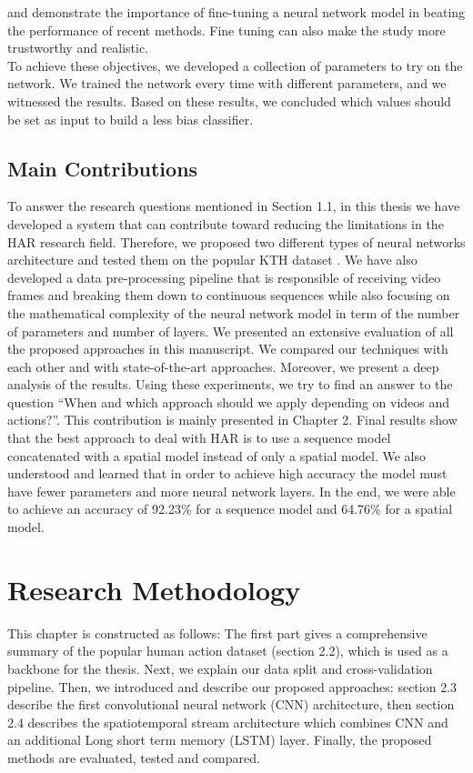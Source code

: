 \cite{diba2018spatio} and \cite{liu2018attentive} demonstrate the importance of fine-tuning a neural network model in beating the performance of recent methods. Fine tuning can also make the study more trustworthy and realistic.\\
    
    
To achieve these objectives, we developed a collection of parameters to try on the network. We trained the network every time with different parameters, and we witnessed the results. Based on these results, we concluded which values should be set as input to build a less bias classifier.

\section{Main Contributions}
To answer the research questions mentioned in Section 1.1, in this thesis we have developed a system that can contribute toward reducing the limitations in the HAR research field. Therefore, we proposed two different types of neural networks architecture and tested them on the popular KTH dataset \cite{schuldt2004recognizing}. We have also developed a data pre-processing pipeline that is responsible of receiving video frames and breaking them down to continuous sequences while also focusing on the mathematical complexity of the neural network model in term of the number of parameters and number of layers. We presented an extensive evaluation of all the proposed approaches in this manuscript. We compared our techniques with each other and with state-of-the-art approaches. Moreover, we present a deep analysis of the results. Using these experiments, we try to find an answer to the question “When and which approach should we apply depending on videos and actions?”. This contribution is mainly presented in Chapter 2. Final results show that the best approach to deal with HAR is to use a sequence model concatenated with a spatial model instead of only a spatial model. We also understood and learned that in order to achieve high accuracy the model must have fewer parameters and more neural network layers. In the end, we were able to achieve an accuracy of 92.23\% for a sequence model and 64.76\% for a spatial model.

\chapter{Research Methodology}\label{ThesisConventions}
This chapter is constructed as follows: The first part gives a comprehensive summary of the popular human action dataset (section 2.2), which is used as a backbone for the thesis. Next, we explain our data split and cross-validation pipeline. Then, we introduced and describe our proposed approaches: section 2.3 describe the first convolutional neural network (CNN) architecture, then section 2.4 describes the spatiotemporal stream architecture which combines CNN and an additional Long short term memory (LSTM) layer. Finally, the proposed methods are evaluated, tested and compared.

